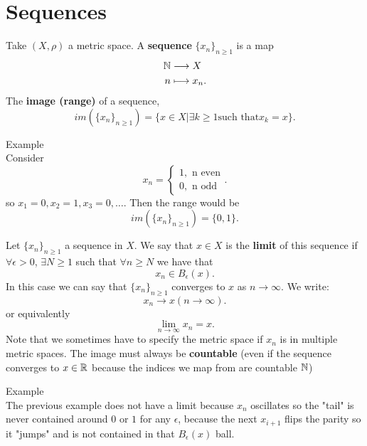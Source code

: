 \documentclass[a4paper]{article}
\begin{document}
\section{Sequences}
\begin{definition}
  Take $\left( X, \rho \right) $ a metric space. A \textbf{sequence} $\{x_n\}_{n \geq 1} $ is a map
  \begin{align*}
     \mathbb{N} &\longrightarrow X  \\
     n &\longmapsto x_n  
  .\end{align*}
  The \textbf{image (range)} of a sequence, 
  \[
    im(\{x_n\}_{n \geq 1}) = \{x \in X | \exists k \geq 1 \text{such that} x_k = x\} 
  .\]
\end{definition}

\begin{note}{Example}\\
  Consider 
  \[
  x_n = \begin{cases}
    1, \text{ n even} \\
    0, \text{ n odd}
  \end{cases}
  .\] so $x_1=0, x_2 = 1, x_3=0, \ldots$. Then the range would be
  \[
  im\left( \{x_n\}_{n \geq 1}  \right) = \{0,1\} 
  .\] 
\end{note}


\begin{definition}
  Let $\{x_n\}_{n \geq 1}$ a sequence in $X$. We say that $x \in X$ is the \textbf{limit} of this sequence if
  $\forall \epsilon > 0$,  $\exists N \geq 1$ such that $\forall n \geq N$ we have that 
   \[
  x_n \in B_\epsilon (x)
  .\] 
  In this case we can say that $\{x_n\}_{n \geq 1}$ converges to $x$ as  $n \to \infty$. We write:
  \[
  x_n \to x (n \to \infty)
  .\]
  or equivalently
  \[
  \lim_{n \to \infty} x_n = x
  .\] 
  Note that we sometimes have to specify the metric space if $x_n$ is in multiple metric spaces. The image must always be \textbf{countable} (even if the sequence converges to $x \in \mathbb{R}$ because the indices we map from are countable $\mathbb{N}$) 
\end{definition}

\begin{note}{Example} \\
  The previous example does not have a limit because $x_n$ oscillates so the "tail" is never contained
  around  $0$ or $1$ for any  $\epsilon$, because the next  $x_{i+1}$ flips the parity so it "jumps"
  and is not contained in that $B_{\epsilon}(x)$ ball.
\end{note}
\end{document}
